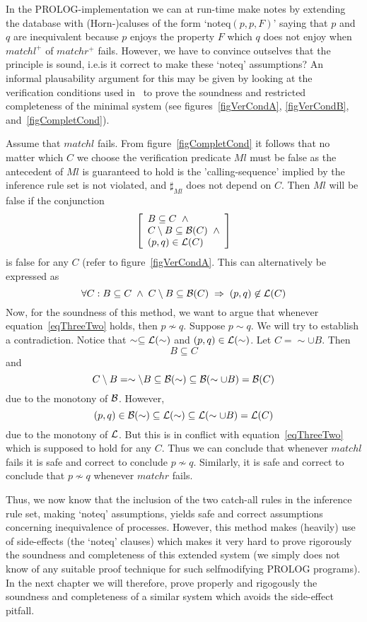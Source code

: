 In the PROLOG-implementation we can at run-time make notes by extending the database with (Horn-)caluses of the form `noteq$(p,p,F)$' saying that $p$ and $q$ are inequivalent because $p$ enjoys the property $F$ which $q$ does not enjoy when $matchl^{+}$ of $matchr^{+}$ fails. However, we have to convince outselves that the principle is sound, i.e.\@ is it correct to make these `noteq' assumptions? An informal plausability argument for this may be given by looking at the verification conditions used in~\cite{Larsen} to prove the soundness and restricted completeness of the minimal system (see figures~\ref{figVerCondA}, \ref{figVerCondB}, and~\ref{figCompletCond}).

Assume that $matchl$ fails. From figure~\ref{figCompletCond} it follows that no matter which $C$ we choose the verification predicate $Ml$ must be false as the antecedent of $Ml$ is guaranteed to hold is the 'calling-sequence' implied by the inference rule set is not violated, and $\sharp_{Ml}$ does not depend on $C$. Then $Ml$ will be false if the conjunction
\[
\left[\begin{array}{l}
B\subseteq C\;\;\wedge\\
C\setminus B\subseteq {\cal B}(C)\;\;\wedge\\
(p,q)\in {\cal L}(C)
\end{array}\right]
\]
is false for any $C$ (refer to figure~\ref{figVerCondA}. This can alternatively be expressed as
\begin{equation}\label{eqThreeTwo}
\forall C: B\subseteq C\; \wedge\; C\setminus B\subseteq {\cal B}(C)\;\Rightarrow\; (p,q)\not\in{\cal L}(C)
\end{equation}
Now, for the soundness of this method, we want to argue that whenever equation~\ref{eqThreeTwo} holds, then $p\not\sim q$. Suppose $p\sim q$. We will try to establish a contradiction. Notice that $\sim\subseteq{\cal L}(\sim)$ and $(p,q)\in{\cal L}(\sim)$. Let $C=\sim\cup B$. Then
\[
B\subseteq C
\]
and
\[
C\setminus B = \sim \setminus B\subseteq {\cal B}(\sim)\subseteq {\cal B}(\sim \cup B) = {\cal B}(C)
\]
due to the monotony of $\cal B$. However,
\[
(p,q)\in {\cal B}(\sim) \subseteq {\cal L}(\sim) \subseteq {\cal L}(\sim\cup B) = {\cal L}(C)
\]
due to the monotony of $\cal L$. But this is in conflict with equation~\ref{eqThreeTwo} which is supposed to hold for any $C$. Thus we can conclude that whenever $matchl$ fails it is safe and correct to conclude $p\not\sim q$. Similarly, it is safe and correct to conclude that $p\not\sim q$ whenever $matchr$ fails.

Thus, we now know that the inclusion of the two catch-all rules in the inference rule set, making `noteq' assumptions, yields safe and correct assumptions concerning inequivalence of processes. However, this method makes (heavily) use of side-effects (the `noteq' clauses) which makes it very hard to prove rigorously the soundness and completeness of this extended system (we simply does not know of any suitable proof technique for such selfmodifying PROLOG programs). In the next chapter we will therefore, prove properly and rigogously the soundness and completeness of a similar system which avoids the side-effect pitfall.


